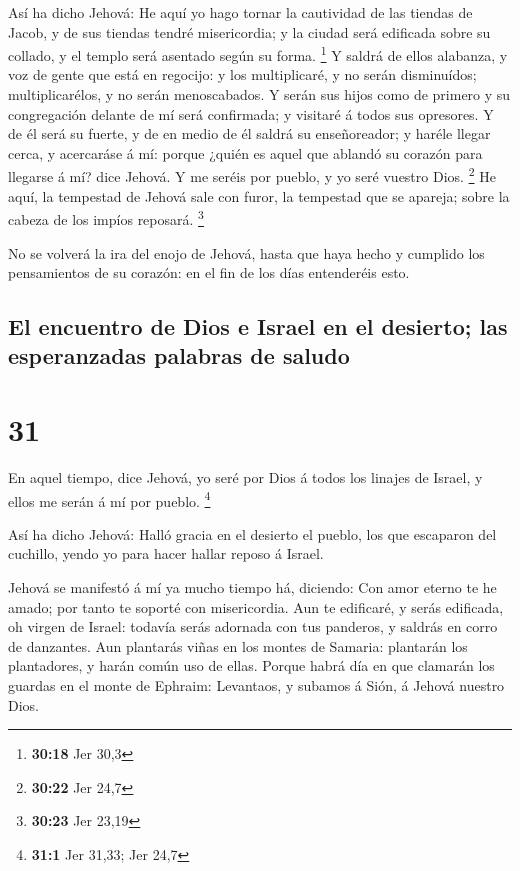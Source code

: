  Así ha dicho Jehová: He aquí yo hago tornar la cautividad
de las tiendas de Jacob, y de sus tiendas tendré misericordia; y la
ciudad será edificada sobre su collado, y el templo será asentado según
su forma. \footnote{\textbf{30:18} Jer 30,3}  Y saldrá de
ellos alabanza, y voz de gente que está en regocijo: y los multiplicaré,
y no serán disminuídos; multiplicarélos, y no serán menoscabados.
 Y serán sus hijos como de primero y su congregación
delante de mí será confirmada; y visitaré á todos sus opresores.
 Y de él será su fuerte, y de en medio de él saldrá su
enseñoreador; y haréle llegar cerca, y acercaráse á mí: porque ¿quién es
aquel que ablandó su corazón para llegarse á mí? dice Jehová.
 Y me seréis por pueblo, y yo seré vuestro Dios.
\footnote{\textbf{30:22} Jer 24,7}  He aquí, la tempestad
de Jehová sale con furor, la tempestad que se apareja; sobre la cabeza
de los impíos reposará. \footnote{\textbf{30:23} Jer 23,19}

 No se volverá la ira del enojo de Jehová, hasta que haya
hecho y cumplido los pensamientos de su corazón: en el fin de los días
entenderéis esto.

\hypertarget{el-encuentro-de-dios-e-israel-en-el-desierto-las-esperanzadas-palabras-de-saludo}{%
\subsection{El encuentro de Dios e Israel en el desierto; las
esperanzadas palabras de
saludo}\label{el-encuentro-de-dios-e-israel-en-el-desierto-las-esperanzadas-palabras-de-saludo}}

\hypertarget{section-30}{%
\section{31}\label{section-30}}

 En aquel tiempo, dice Jehová, yo seré por Dios á todos los
linajes de Israel, y ellos me serán á mí por pueblo. \footnote{\textbf{31:1}
  Jer 31,33; Jer 24,7}

 Así ha dicho Jehová: Halló gracia en el desierto el pueblo,
los que escaparon del cuchillo, yendo yo para hacer hallar reposo á
Israel.

 Jehová se manifestó á mí ya mucho tiempo há, diciendo: Con
amor eterno te he amado; por tanto te soporté con misericordia.
 Aun te edificaré, y serás edificada, oh virgen de Israel:
todavía serás adornada con tus panderos, y saldrás en corro de
danzantes.  Aun plantarás viñas en los montes de Samaria:
plantarán los plantadores, y harán común uso de ellas. 
Porque habrá día en que clamarán los guardas en el monte de Ephraim:
Levantaos, y subamos á Sión, á Jehová nuestro Dios.

